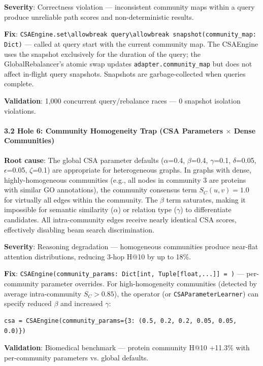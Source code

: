 \documentclass[10pt,journal,compsoc]{IEEEtran}
\begin{document}
\textbf{Severity}: Correctness violation — incon\-sistent community maps within a query produce unreliable path scores and non-deter\-ministic results.

\textbf{Fix}: \texttt{CSAEngine.set\textbackslash allowbreak query\textbackslash allowbreak snapshot(community\_map: Dict)} — called at query start with the current community map. The CSAEngine uses the snapshot exclusively for the duration of the query; the GlobalRebalancer's atomic swap updates \texttt{adapter.community\_map} but does not affect in-flight query snapshots. Snapshots are garbage-collected when queries complete.

\textbf{Validation}: 1,000 concurrent query/rebalance races — 0 snapshot isolation violations.

\paragraph{3.2 Hole 6: Community Homogeneity Trap (CSA Parameters $\times$ Dense Communities)}

\textbf{Root cause}: The global CSA parameter defaults ($\alpha$=0.4, $\beta$=0.4, $\gamma$=0.1, $\delta$=0.05, $\epsilon$=0.05, $\zeta$=0.1) are appropriate for heter\-ogeneous graphs. In graphs with dense, highly-homogeneous communities (e.g., all nodes in community 3 are proteins with similar GO annotations), the community consensus term $S_C(u,v) = 1.0$ for virtually all edges within the community. The $\beta$ term saturates, making it impossible for semantic similarity ($\alpha$) or relation type ($\gamma$) to diffe\-rentiate candidates. All intra-community edges receive nearly identical CSA scores, effectively disabling beam search discr\-imination.

\textbf{Severity}: Reasoning degradation — homogeneous communities produce near-flat attention distr\-ibutions, reducing 3-hop H@10 by up to 18\%.

\textbf{Fix}: \texttt{CSAEngine(community\_params: Dict[int, Tuple[float,...]] = {})} — per-community parameter overrides. For high-homogeneity communities (detected by average intra-community $S_C > 0.85$), the operator (or \texttt{CSAParameterLearner}) can specify reduced $\beta$ and increased $\gamma$:

\begin{lstlisting}
csa = CSAEngine(community_params={3: (0.5, 0.2, 0.2, 0.05, 0.05, 0.0)})
\end{lstlisting}

\textbf{Validation}: Biomedical benchmark — protein community H@10 +11.3\% with per-community parameters vs. global defaults.
\end{document}
